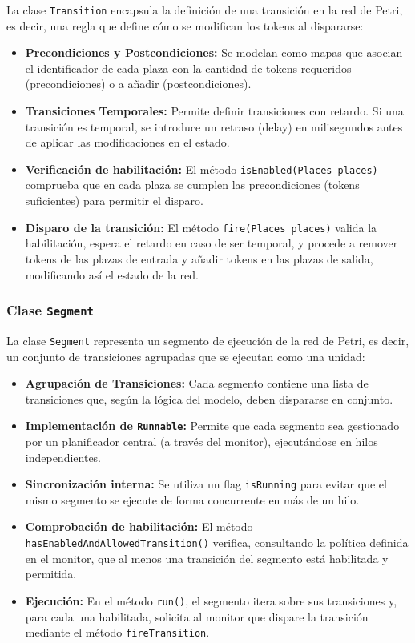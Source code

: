 \documentclass[12pt]{article}
\begin{document}
La clase \texttt{Transition} encapsula la definición de una transición en la red de Petri, es decir, una regla que define cómo se modifican los tokens al dispararse:
\begin{itemize}
    \item \textbf{Precondiciones y Postcondiciones:} Se modelan como mapas que asocian el identificador de cada plaza con la cantidad de tokens requeridos (precondiciones) o a añadir (postcondiciones).
    \item \textbf{Transiciones Temporales:} Permite definir transiciones con retardo. Si una transición es temporal, se introduce un retraso (delay) en milisegundos antes de aplicar las modificaciones en el estado.
    \item \textbf{Verificación de habilitación:} El método \texttt{isEnabled(Places places)} comprueba que en cada plaza se cumplen las precondiciones (tokens suficientes) para permitir el disparo.
    \item \textbf{Disparo de la transición:} El método \texttt{fire(Places places)} valida la habilitación, espera el retardo en caso de ser temporal, y procede a remover tokens de las plazas de entrada y añadir tokens en las plazas de salida, modificando así el estado de la red.
\end{itemize}

\subsubsection{Clase \texttt{Segment}}

La clase \texttt{Segment} representa un segmento de ejecución de la red de Petri, es decir, un conjunto de transiciones agrupadas que se ejecutan como una unidad:
\begin{itemize}
    \item \textbf{Agrupación de Transiciones:} Cada segmento contiene una lista de transiciones que, según la lógica del modelo, deben dispararse en conjunto.
    \item \textbf{Implementación de \texttt{Runnable}:} Permite que cada segmento sea gestionado por un planificador central (a través del monitor), ejecutándose en hilos independientes.
    \item \textbf{Sincronización interna:} Se utiliza un flag \texttt{isRunning} para evitar que el mismo segmento se ejecute de forma concurrente en más de un hilo.
    \item \textbf{Comprobación de habilitación:} El método \texttt{hasEnabledAndAllowedTransition()} verifica, consultando la política definida en el monitor, que al menos una transición del segmento está habilitada y permitida.
    \item \textbf{Ejecución:} En el método \texttt{run()}, el segmento itera sobre sus transiciones y, para cada una habilitada, solicita al monitor que dispare la transición mediante el método \texttt{fireTransition}.
\end{itemize}
\end{document}
